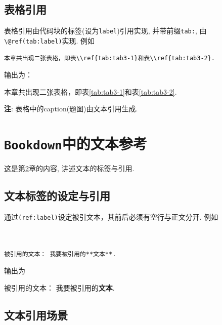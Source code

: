 \documentclass[12pt,]{krantz}
\theoremstyle{plain}
\theoremstyle{nonumberplain}
\begin{document}
\hypertarget{sec6-3}{%
\section{表格引用}\label{sec6-3}}

\indent

表格引用由代码块的标签(设为\texttt{label})引用实现, 并带前缀\texttt{tab:}, 由\texttt{\textbackslash{}@ref(tab:label)}实现. 例如

\begin{verbatim}
本章共出现二张表格，即表\\ref{tab:tab3-1}和表\\ref{tab:tab3-2}.
\end{verbatim}

输出为：

本章共出现二张表格，即表\ref{tab:tab3-1}和表\ref{tab:tab3-2}.

\textbf{注}: 表格中的caption(题图)由文本引用生成.

\printbibliography[segment=\therefsegment, heading=subbibliography, title={参考文献}]

\hypertarget{textref}{%
\chapter{\texorpdfstring{\texttt{Bookdown}中的文本参考}{Bookdown中的文本参考}}\label{textref}}

\indent

这是第\ref{textref}章的内容, 讲述文本的标签与引用. \autocite{xie2015,R-base}

\hypertarget{sec7-1}{%
\section{文本标签的设定与引用}\label{sec7-1}}

\indent

通过\texttt{(ref:label)}设定被引文本，其前后必须有空行与正文分开. 例如

\begin{verbatim}


被引用的文本： 我要被引用的**文本**.  
\end{verbatim}

输出为



被引用的文本： 我要被引用的\textbf{文本}.

\hypertarget{sec7-2}{%
\section{文本引用场景}\label{sec7-2}}
\end{document}
